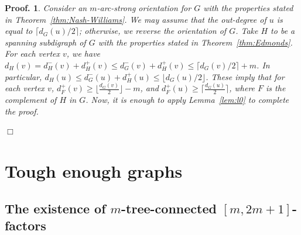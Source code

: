 \documentclass[10pt,bezier]{article}
\newtheorem{preproof}{{\bf Proof.}}
\newenvironment{proof}[1]{\begin{preproof}{\rm
#1}\hfill{$\Box$}}{\end{preproof}}
\begin{document}
%
\begin{proof}{
Consider an $m$-arc-strong orientation for $G$ with the properties stated in Theorem~\ref{thm:Nash-Williams}. 
We may assume that the out-degree of $u$ is equal to $\lceil d_G(u)/2\rceil$; otherwise, we reverse the orientation of $G$.
Take
$H$ to be a spanning subdigraph of $G$ with the properties stated in Theorem~\ref{thm:Edmonds}.
For each vertex $v$, we have
$d_H(v)=d^-_H(v)+d^+_H(v)\le d^-_G(v)+d^+_H(v) \le \lceil d_G(v)/2\rceil+m$.
In particular, 
$d_H(u)\le d^-_G(u)+d^+_H(u) \le \lfloor d_G(u)/2\rfloor$.
These imply that for each vertex $v$, $d^+_F(v)\ge \lfloor \frac{d_G(v)}{2}\rfloor-m$, and $d^+_F(u)\ge \lceil \frac{d_G(u)}{2}\rceil$, where $F$ is the complement of $H$ in $G$.
Now, it is enough to apply Lemma~\ref{lem:l0} to complete the proof.
}\end{proof}
%
%
%
%
%
%
%
%
%
%
%
%
%

\section{Tough enough graphs}
\label{sec:tough-graph}
%
\subsection{The existence of $m$-tree-connected $[m,2m+1]$-factors}
\label{subsec:toughenough}
\end{document}
